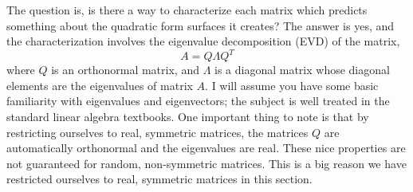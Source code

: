 \documentclass[onefignum,onetabnum]{siamart190516}
\begin{document}
The question is, is there a way to characterize each matrix which predicts something about
the quadratic form surfaces it creates?  The answer is yes, and the characterization involves
the eigenvalue decomposition (EVD) of the matrix,
\begin{equation}
\label{eq:evd}
A = Q \Lambda Q^T
\end{equation}
where $Q$ is an orthonormal matrix, and $\Lambda$ is a diagonal matrix whose diagonal elements
are the eigenvalues of matrix $A$.  I will assume you have some basic familiarity with
eigenvalues and eigenvectors; the subject is well treated in the standard linear algebra
textbooks.  One important thing to note is that by restricting ourselves to real, symmetric
matrices, the matrices $Q$ are automatically orthonormal and the eigenvalues are real.  These nice
properties are not guaranteed for random, non-symmetric matrices.  This is a big reason we have
restricted ourselves to real, symmetric matrices in this section.
\end{document}
